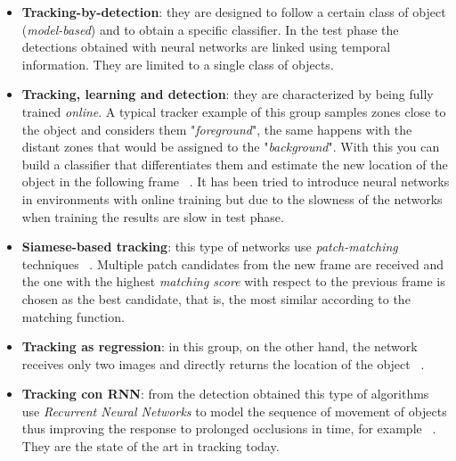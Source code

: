 \documentclass{bmvc2k}
\begin{document}
\begin{itemize}
\item \textbf{Tracking-by-detection}: they are designed to follow a certain class of object (\textit{model-based}) and to obtain a specific classifier. In the test phase the detections obtained with neural networks are linked using temporal information. They are limited to a single class of objects.
\item \textbf{Tracking, learning and detection}: they are characterized by being fully trained \textit{online}. A typical tracker example of this group samples zones close to the object and considers them "\textit{foreground}", the same happens with the distant zones that would be assigned to the "\textit{background}". With this you can build a classifier that differentiates them and estimate the new location of the object in the following frame ~\cite{babenko2009visual}. It has been tried to introduce neural networks in environments with online training but due to the slowness of the networks when training the results are slow in test phase.
\item \textbf{Siamese-based tracking}: this type of networks use \textit{patch-matching} techniques ~\cite{tao2016siamese}.   Multiple patch candidates from the new frame are received and the one with the highest \textit{matching score} with respect to the previous frame is chosen as the best candidate, that is, the most similar according to the matching function.
\item \textbf{Tracking as regression}: in this group, on the other hand, the network receives only two images and directly returns the location of the object ~\cite{held2016learning}.
\item \textbf{Tracking con RNN}: from the detection obtained this type of algorithms use \textit{Recurrent Neural Networks} to model the sequence of movement of objects thus improving the response to prolonged occlusions in time, for example ~\cite{sadeghian2017tracking}. They are the state of the art in tracking today. %
\end{itemize}
\end{document}
